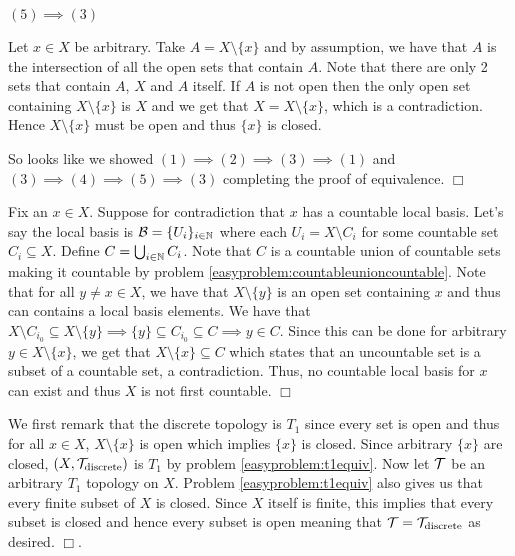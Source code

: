 \documentclass{article}
\begin{document}
{    $(5)\implies (3)$

    Let $x\in X$ be arbitrary. Take $A = X\setminus\{x\}$ and by assumption, we have that $A$ is the intersection of all the open sets that contain $A$. Note that there are only 2 sets that contain $A$, $X$ and $A$ itself. If $A$ is not open then the only open set containing $X\setminus\{x\}$ is $X$ and we get that $X = X\setminus\{x\}$, which is a contradiction. Hence $X\setminus\{x\}$ must be open and thus $\{x\}$ is closed.

    So looks like we showed $(1)\implies (2)\implies (3)\implies (1)$ and $(3)\implies (4)\implies (5)\implies(3)$ completing the proof of equivalence. $\Box$
}

 {
    Fix an $x\in X$. Suppose for contradiction that $x$ has a countable local basis. Let's say the local basis is $\mathcal{B} = \{U_{i}\}_{i\in\mathbb{N}}$ where each $U_{i} = X\setminus C_{i}$ for some countable set $C_{i}\subseteq X$. Define $C = \bigcup_{i\in\mathbb{N}} C_{i}$. Note that $C$ is a countable union of countable sets making it countable by problem \ref{easyproblem:countableunioncountable}. Note that for all $y\neq x \in X$, we have that $X\setminus\{y\}$ is an open set containing $x$ and thus can contains a local basis elements. We have that $X\setminus C_{i_{0}}\subseteq X\setminus\{y\} \implies \{y\}\subseteq C_{i_{0}}\subseteq C \implies y\in C$. Since this can be done for arbitrary $y\in X\setminus \{x\}$, we get that $X\setminus \{x\}\subseteq C$ which states that an uncountable set is a subset of a countable set, a contradiction. Thus, no countable local basis for $x$ can exist and thus $X$ is not first countable. $\Box$
}

 {
    We first remark that the discrete topology is $T_{1}$ since every set is open and thus for all $x\in X$, $X\setminus \{x\}$ is open which implies $\{x\}$ is closed. Since arbitrary $\{x\}$ are closed, $(X,\mathcal{T}_{\text{discrete}})$ is $T_{1}$ by problem \ref{easyproblem:t1equiv}. Now let $\mathcal{T}$ be an arbitrary $T_{1}$ topology on $X$. Problem \ref{easyproblem:t1equiv} also gives us that every finite subset of $X$ is closed. Since $X$ itself is finite, this implies that every subset is closed and hence every subset is open meaning that $\mathcal{T} = \mathcal{T}_{\text{discrete}}$ as desired. $\Box$.
}
\end{document}
